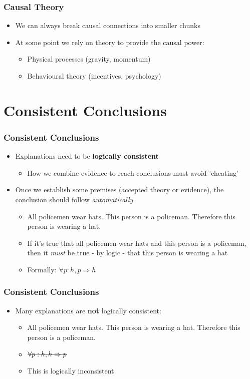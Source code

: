 \documentclass[xcolor=x11names,compress]{beamer}\usepackage[]{graphicx}\usepackage[]{color}
\renewcommand{\(}{\begin{columns}}
\renewcommand{\)}{\end{columns}}
\newcommand{\<}[1]{\begin{column}{#1}}
\renewcommand{\>}{\end{column}}
\begin{document}
\begin{frame}
\frametitle{Causal Theory}
\begin{itemize}
\item We can always break causal connections into smaller chunks
\pause
\item At some point we rely on theory to provide the causal power:
\begin{itemize}
\item Physical processes (gravity, momentum)
\item Behavioural theory (incentives, psychology)
\end{itemize}
\end{itemize}
\end{frame}

\section{Consistent Conclusions}

\begin{frame}
\frametitle{Consistent Conclusions}
\begin{itemize}
\item Explanations need to be \textbf{logically consistent}
\pause
\begin{itemize}
\item How we combine evidence to reach conclusions must avoid 'cheating'
\end{itemize}
\pause
\item Once we establish some premises (accepted theory or evidence), the conclusion should follow \textit{automatically}
\begin{itemize}
\item All policemen wear hats. This person is a policeman. Therefore this person is wearing a hat.
\pause
\item If it's true that all policemen wear hats and this person is a policeman, then it \textit{must} be true - by logic - that this person is wearing a hat
\pause
\item Formally: $\forall p:  h, p \Rightarrow h$
\end{itemize}
\end{itemize}
\end{frame}

\begin{frame}
\frametitle{Consistent Conclusions}
\begin{itemize}
\item Many explanations are \textbf{not} logically consistent:
\pause
\begin{itemize}
\item All policemen wear hats. This person is wearing a hat. Therefore this person is a policeman.
\pause
\item $\text{\sout{\ensuremath{\forall p:  h, h \Rightarrow p}}}$
\item This is logically inconsistent
\end{itemize}
\end{itemize}
\end{frame}
\end{document}
